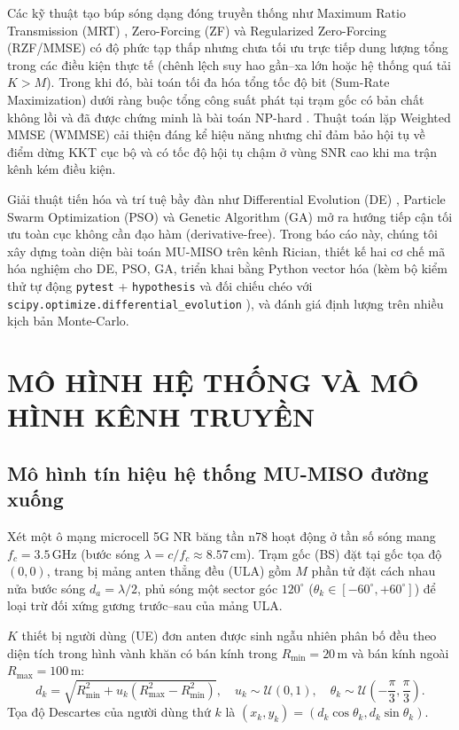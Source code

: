 \documentclass[12pt, a4paper]{article}
\begin{document}
Các kỹ thuật tạo búp sóng dạng đóng truyền thống như Maximum Ratio Transmission (MRT) \cite{lo1999}, Zero-Forcing (ZF) \cite{spencer2004} và Regularized Zero-Forcing (RZF/MMSE) \cite{peel2005} có độ phức tạp thấp nhưng chưa tối ưu trực tiếp dung lượng tổng trong các điều kiện thực tế (chênh lệch suy hao gần--xa lớn hoặc hệ thống quá tải $K > M$). Trong khi đó, bài toán tối đa hóa tổng tốc độ bit (Sum-Rate Maximization) dưới ràng buộc tổng công suất phát tại trạm gốc có bản chất không lồi và đã được chứng minh là bài toán NP-hard \cite{shi2011, bjornson2014}. Thuật toán lặp Weighted MMSE (WMMSE) \cite{shi2011} cải thiện đáng kể hiệu năng nhưng chỉ đảm bảo hội tụ về điểm dừng KKT cục bộ và có tốc độ hội tụ chậm ở vùng SNR cao khi ma trận kênh kém điều kiện.

Giải thuật tiến hóa và trí tuệ bầy đàn như Differential Evolution (DE) \cite{storn1997}, Particle Swarm Optimization (PSO) \cite{kennedy1995, shi1998} và Genetic Algorithm (GA) \cite{goldberg1989} mở ra hướng tiếp cận tối ưu toàn cục không cần đạo hàm (derivative-free). Trong báo cáo này, chúng tôi xây dựng toàn diện bài toán MU-MISO trên kênh Rician, thiết kế hai cơ chế mã hóa nghiệm cho DE, PSO, GA, triển khai bằng Python vector hóa (kèm bộ kiểm thử tự động \texttt{pytest} + \texttt{hypothesis} và đối chiếu chéo với \texttt{scipy.optimize.differential\_evolution} \cite{virtanen2020}), và đánh giá định lượng trên nhiều kịch bản Monte-Carlo.

\section{MÔ HÌNH HỆ THỐNG VÀ MÔ HÌNH KÊNH TRUYỀN}

\subsection{Mô hình tín hiệu hệ thống MU-MISO đường xuống}
Xét một ô mạng microcell 5G NR băng tần n78 hoạt động ở tần số sóng mang $f_c = 3.5\,\text{GHz}$ (bước sóng $\lambda = c / f_c \approx 8.57\,\text{cm}$). Trạm gốc (BS) đặt tại gốc tọa độ $(0, 0)$, trang bị mảng anten thẳng đều (ULA) gồm $M$ phần tử đặt cách nhau nửa bước sóng $d_a = \lambda / 2$, phủ sóng một sector góc $120^\circ$ ($\theta_k \in [-60^\circ, +60^\circ]$) để loại trừ đối xứng gương trước--sau của mảng ULA.

$K$ thiết bị người dùng (UE) đơn anten được sinh ngẫu nhiên phân bố đều theo diện tích trong hình vành khăn có bán kính trong $R_{\min} = 20\,\text{m}$ và bán kính ngoài $R_{\max} = 100\,\text{m}$:
\begin{equation}
    d_k = \sqrt{R_{\min}^2 + u_k (R_{\max}^2 - R_{\min}^2)}, \quad u_k \sim \mathcal{U}(0, 1), \quad \theta_k \sim \mathcal{U}\!\left(-\frac{\pi}{3}, \frac{\pi}{3}\right).
\end{equation}
Tọa độ Descartes của người dùng thứ $k$ là $(x_k, y_k) = (d_k \cos\theta_k, d_k \sin\theta_k)$.
\end{document}
